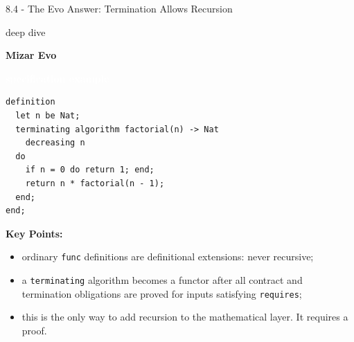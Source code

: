 \documentclass[aspectratio=169,11pt]{beamer}
\newcommand{\statusbadge}[2]{\colorbox{#1}{\textcolor{white}{\strut\scriptsize\sffamily\bfseries #2}}}
\newcommand{\badgeSpec}{\statusbadge{green!35!black}{specification example}}
\newcommand{\deepdivetag}{\hfill\colorbox{black!15}{\textcolor{black!65}{\strut\scriptsize\sffamily deep dive}}}
\begin{document}
\begin{frame}[fragile,t]{8.4 - The Evo Answer: Termination Allows Recursion\deepdivetag}
\smallskip
\textbf{Mizar Evo}~\badgeSpec
\begin{lstlisting}[language={mizar},basicstyle=\ttfamily\footnotesize]
definition
  let n be Nat;
  terminating algorithm factorial(n) -> Nat
    decreasing n
  do
    if n = 0 do return 1; end;
    return n * factorial(n - 1);
  end;
end;
\end{lstlisting}
\smallskip
\textbf{Key Points:}
\begin{itemize}
\setlength{\itemsep}{1pt}
\setlength{\parsep}{0pt}
\setlength{\parskip}{0pt}
\item ordinary \texttt{func} definitions are definitional extensions: never recursive;
\item a \texttt{terminating} algorithm becomes a functor after all contract and termination obligations are proved for inputs satisfying \texttt{requires};
\item this is the only way to add recursion to the mathematical layer. It requires a proof.
\end{itemize}
\end{frame}
\end{document}
